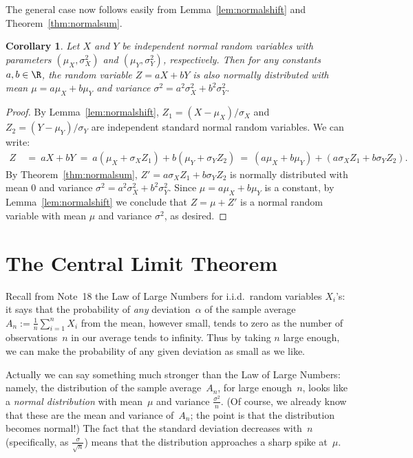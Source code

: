 \documentclass[11pt]{article}
\newcounter{thm}
\newtheorem{corollary}{Corollary}[thm]
\begin{document}
The general case now follows easily from Lemma~\ref{lem:normalshift} and Theorem~\ref{thm:normalsum}.

\begin{corollary}
Let $X$ and $Y$ be independent normal random variables with parameters $(\mu_X, \sigma^2_X)$ and $(\mu_Y, \sigma^2_Y)$, respectively. Then for any constants $a,b \in \R$, the random variable $Z = aX + bY$ is also normally distributed with mean $\mu = a\mu_X + b \mu_Y$ and variance $\sigma^2 = a^2 \sigma_X^2 + b^2 \sigma_Y^2$.
\end{corollary}
\begin{proof}
By Lemma~\ref{lem:normalshift}, $Z_1 = (X - \mu_X) / \sigma_X$ and $Z_2 = (Y - \mu_Y) / \sigma_Y$ are independent standard normal random variables. We can write:
\begin{align*}
Z ~&=~ aX + bY
~=~ a(\mu_X + \sigma_X Z_1) + b(\mu_Y + \sigma_Y Z_2)
~=~ (a\mu_X + b\mu_Y) + (a\sigma_X Z_1 + b\sigma_Y Z_2).
\end{align*}
By Theorem~\ref{thm:normalsum}, $Z' = a\sigma_X Z_1 + b\sigma_Y Z_2$ is normally distributed with mean $0$ and variance
$\sigma^2 = a^2 \sigma_X^2 + b^2 \sigma_Y^2$. Since $\mu = a\mu_X + b\mu_Y$ is a constant, by Lemma~\ref{lem:normalshift} we conclude that $Z = \mu + Z'$ is a normal random variable with mean $\mu$ and variance $\sigma^2$, as desired.
\end{proof}




\section*{The Central Limit Theorem}

Recall from Note~18 the Law of Large Numbers for i.i.d.\
random variables $X_i$'s: it says that the probability of {\it any\/}
deviation~$\alpha$ of the sample average $A_n :=
\frac{1}{n}{\sum_{i=1}^n X_i}$ from the mean, however small, tends
to zero as the number of observations~$n$ in our average tends to
infinity. Thus by taking $n$ large enough, we can make the
probability of any given deviation as small as we like.

Actually we can say something much stronger than the Law of Large
Numbers: namely, the distribution of the sample average~$A_n$, for
large enough~$n$, looks like a {\it normal distribution\/} with
mean~$\mu$ and variance $\frac{\sigma^2}{n}$.  (Of course, we
already know that these are the mean and variance of~$A_n$; the
point is that the distribution becomes normal!)  The fact that the
standard deviation decreases with~$n$ (specifically, as
$\frac{\sigma}{\sqrt{n}}$) means that the distribution approaches a
sharp spike at~$\mu$.
\end{document}
